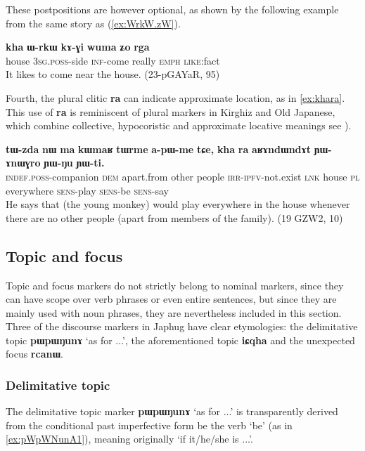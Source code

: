 \documentclass[oldfontcommands,oneside,a4paper,11pt]{article}
\newcommand{\ipa}[1]{\mbox{\phon\textbf{#1}}} %
\begin{document}
These postpositions are however optional, as shown by the following example from the same story as (\ref{ex:WrkW.zW}).

\begin{exe}
\ex \label{ex:kha.WrkW}
\gll
\ipa{kha} 	\ipa{ɯ-rkɯ} 	\ipa{kɤ-ɣi} 	\ipa{wuma} 	\ipa{ʑo} 	\ipa{rga} \\
house \textsc{3sg.poss}-side  \textsc{inf}-come really \textsc{emph} \textsc{like}:fact \\
\glt It likes to come near the house. (23-pGAYaR, 95)
\end{exe}

Fourth, the plural clitic \ipa{ra} can indicate approximate location, as in \ref{ex:khara}. This use of \ipa{ra} is reminiscent of plural markers in Kirghiz and Old Japanese, which combine collective, hypocoristic and approximate locative meanings see \citealt[195]{antonov07ra}).

\begin{exe}
\ex \label{ex:khara}
\gll
\ipa{tɯ-zda} 	\ipa{nɯ} 	\ipa{ma} 	\ipa{kɯmaʁ} 	\ipa{tɯrme} 	\ipa{a-pɯ-me} 	\ipa{tɕe,} 	\ipa{kha} 	\ipa{ra} 	\ipa{aʁɤndɯndɤt} \ipa{ɲɯ-ɤnɯɣro} 	\ipa{ɲɯ-ŋu} 	\ipa{ɲɯ-ti.} \\
\textsc{indef.poss}-companion \textsc{dem} apart.from other people \textsc{irr-ipfv}-not.exist \textsc{lnk} house \textsc{pl} everywhere \textsc{sens}-play \textsc{sens}-be \textsc{sens}-say \\
\glt He says that (the young monkey) would play everywhere in the house whenever there are no other people (apart from members of the family). (19 GZW2, 10)
\end{exe}


   \subsection{Topic and focus} \label{sec:topic}
Topic and focus markers do not strictly belong to nominal markers, since they can have scope over verb phrases or even entire sentences, but since they are mainly used with noun phrases, they are nevertheless included in this section. Three of the discourse markers in Japhug have clear etymologies: the delimitative topic \ipa{pɯpɯŋunɤ} `as for ...', the aforementioned topic \ipa{iɕqha} and the unexpected focus \ipa{rcanɯ}.

  \subsubsection{Delimitative topic}
The delimitative topic marker \ipa{pɯpɯŋunɤ} `as for ...' is transparently derived from the conditional past imperfective form be the verb `be' (as in \ref{ex:pWpWNunA1}), meaning originally `if it/he/she is ...'.
\end{document}
